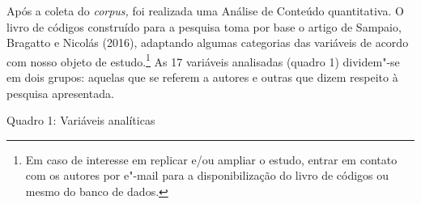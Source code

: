 Após a coleta do \emph{corpus,} foi realizada uma Análise de Conteúdo
quantitativa. O livro de códigos construído para a pesquisa toma por
base o artigo de Sampaio, Bragatto e Nicolás (2016), adaptando algumas
categorias das variáveis de acordo com nosso objeto de estudo.\footnote{Em
  caso de interesse em replicar e/ou ampliar o estudo, entrar em contato
  com os autores por e"-mail para a disponibilização do livro de códigos
  ou mesmo do banco de dados.} As 17 variáveis analisadas (quadro 1)
dividem"-se em dois grupos: aquelas que se referem a autores e outras
que dizem respeito à pesquisa apresentada.

\pagebreak

\begin{center}
Quadro 1: Variáveis analíticas
\end{center}


